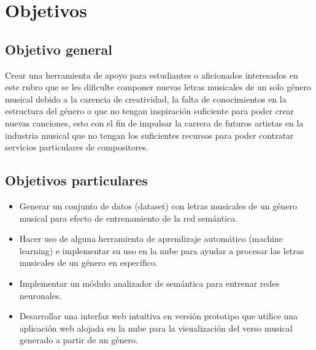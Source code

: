 \documentclass[12pt, a4paper, titlepage]{report}
\begin{document}
	\section{Objetivos}
	\subsection{Objetivo general}
	Crear una herramienta de apoyo para estudiantes o aficionados interesados en este rubro que se les dificulte componer nuevas letras musicales de un solo género musical debido a la carencia de creatividad, la falta de conocimientos en la estructura del género o que no tengan inspiración suficiente para poder crear nuevas canciones, esto con el fin de impulsar la carrera de futuros artistas en la industria musical que no tengan los suficientes recursos para poder contratar servicios particulares de compositores.
	
	\subsection{Objetivos particulares}
		\begin{itemize}
			\item Generar un conjunto de datos (dataset) con letras musicales de un género musical para efecto de entrenamiento de la red semántica.
    		\item Hacer uso de alguna herramienta de aprendizaje automático (machine learning) e implementar su uso en la nube para ayudar a procesar las letras musicales de un género en específico.
    		\item Implementar un módulo analizador de semántica para entrenar redes neuronales.
    		\item Desarrollar una interfaz web intuitiva en versión prototipo que utilice una aplicación web alojada en la nube para la visualización del verso musical generado a partir de un género.
    	\end{itemize}
		
\end{document}
